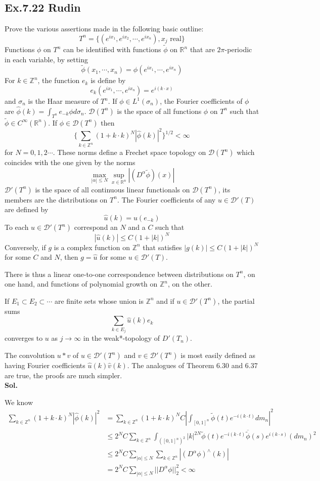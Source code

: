 \documentclass[lang=en,11pt,a4paper,citestyle =authoryear]{elegantpaper}
\newcommand{\Z}{\mathbb{Z}}
\newcommand{\R}{\mathbb{R}}
\newcommand{\D}{\mathscr{D}}
\begin{document}
\subsection*{Ex.7.22 Rudin} 
Prove the various assertions made in the following basic outline:
\[T^n = \{(e^{ix_1},e^{ix_2},\cdots,e^{ix_n}), x_j\text{ real}\}\]
Functions $\phi$ on $T^n$ can be identified with functions $\tilde{\phi}$ on $\R^n$ that are $2\pi$-periodic in each variable, by setting
\[
\tilde{\phi}(x_1,\cdots,x_n) = \phi(e^{ix_1},\cdots,e^{ix_n})
\]
For $k\in \Z^n$, the function $e_k$ is define by
\[e_k(e^{ix_1},\cdots,e^{ix_n}) = e^{i(k\cdot x)}\]
and $\sigma_n$ is the Haar measure of $T^n$. If $\phi \in L^1(\sigma_n)$, the Fourier coefficients of $\phi$ are $\hat{\phi}(k) = \int_{T^n}e_{-k}\phi d\sigma_n$. $\D(T^n)$ is the space of all functions $\phi$ on $T^n$ such that $\tilde{\phi} \in C^{\infty}(\R^n)$. If $\phi \in \D(T^n)$ then
\[
\{\sum\limits_{k\in\Z^n}(1+k\cdot k)^N |\hat{\phi}(k)|^2\}^{1/2} < \infty
\]
for $N = 0,1,2\cdots$. These norms define a Frechet space topology on $\D(T^n)$ which coincides with the one given by the norms
\[
\max_{|\alpha| \leq N}\sup_{x\in \R^n}|(D^{\alpha}\tilde{\phi})(x)|
\]
$\D'(T^n)$ is the space of all continuous linear functionals on $\D(T^n)$, its members are the distributions on $T^n$. The Fourier coefficients of any $u \in \D'(T)$ are defined by
\[
\hat{u}(k) = u(e_{-k})
\]
To each $u\in \D'(T^n)$ correspond an $N$ and a $C$ such that
\[
|\hat{u}(k)| \leq C(1+|k|)^N
\]
Conversely, if $g$ is a complex function on $\Z^n$ that satisfies $|g(k)| \leq C(1+|k|)^N$ for some $C$ and $N$, then $g = \hat{u}$ for some $u\in\D'(T)$.\par
There is thus a linear one-to-one correspondence between distributions on $T^n$, on one hand, and functions of polynomial growth on $\Z^n$, on the other.\par
If $E_1 \subset E_2\subset \cdots$ are finite sets whose union is $\Z^n$ and if $u\in\D'(T^n)$, the partial sums
\[
\sum\limits_{k \in E_j} \hat{u}(k)e_k
\]
converges to $u$ as $j\to\infty$ in the weak*-topology of $D'(T_n)$.\par
The convolution $u*v$ of $u\in\D'(T^n)$ and $v\in\D'(T^n)$ is most easily defined as having Fourier coefficients $\hat{u}(k)\hat{v}(k)$. The analogues of Theorem 6.30 and 6.37 are true, the proofs are much simpler.
\vspace{0.5em}\\
\textbf{Sol.} \par
We know
\[
\begin{aligned}
\sum\limits_{k\in\Z^n}(1+k\cdot k)^N |\hat{\phi}(k)|^2 &= \sum\limits_{k\in\Z^n}(1+k\cdot k)^N C|\int_{[0,1]^n}\tilde{\phi}(t)e^{-i(k\cdot t)} d m_n|^2 \\
&\leq 2^NC
\sum\limits_{k\in\Z^n} \int_{([0,1]^n)^2}|k|^{2N}\tilde{\phi}(t)e^{-i(k\cdot t)}\overline{\tilde{\phi}}(s)e^{i(k\cdot s)} (d m_n)^2 \\
&\leq 2^NC \sum\limits_{|\alpha| \leq N} \sum\limits_{k\in \Z^n}|(D^{\alpha}\phi)^{\wedge}(k)| \\
& = 2^NC \sum\limits_{|\alpha| \leq N} ||D^{\alpha}\phi||_2^2< \infty
\end{aligned}
\]
\end{document}
